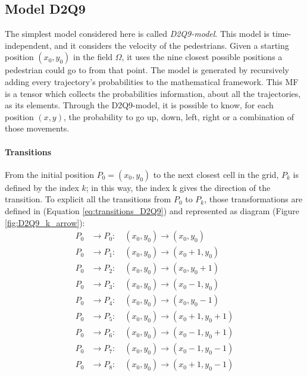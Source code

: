 \documentclass[class=article, crop=false]{standalone}
\begin{document}
\FloatBarrier
\newpage
\subsection{Model D2Q9} \label{chap:Model_D2Q9}

The simplest model considered here is called \emph{D2Q9-model}. 
This model is time-independent, and it considers the velocity of the pedestrians. 
Given a starting position $(x_0, y_0)$ in the field $\Omega$, it uses the nine closest possible positions a pedestrian could go to from that point. 
The model is generated by recursively adding every trajectory's probabilities to the mathematical framework.
This MF is a tensor which collects the probabilities information, about all the trajectories, as its elements.
Through the D2Q9-model, it is possible to know, for each position $(x, y)$, the probability to go up, down, left, right or a combination of those movements.


\paragraph{Transitions} 
From the initial position $P_0=(x_0, y_0)$ to the next closest cell in the grid, $P_k$ is defined by the index $k$; in this way, the index k gives the direction of the transition. 
To explicit all the transitions from $P_0$ to $P_k$, those transformations are defined in (Equation \ref{eq:transitions_D2Q9}) and represented as diagram (Figure \ref{fig:D2Q9_k_arrow}):
\begin{equation}
\begin{split}
P_0 &\to P_0 : \quad (x_0, y_0) \to (x_0, y_0) \\
P_0 &\to P_1 : \quad (x_0, y_0) \to (x_0+1, y_0) \\
P_0 &\to P_2 : \quad (x_0, y_0) \to (x_0, y_0+1) \\
P_0 &\to P_3 : \quad (x_0, y_0) \to (x_0-1, y_0) \\
P_0 &\to P_4 : \quad (x_0, y_0) \to (x_0, y_0-1) \\
P_0 &\to P_5 : \quad (x_0, y_0) \to (x_0+1, y_0+1) \\
P_0 &\to P_6 : \quad (x_0, y_0) \to (x_0-1, y_0+1) \\
P_0 &\to P_7 : \quad (x_0, y_0) \to (x_0-1, y_0-1) \\
P_0 &\to P_8 : \quad (x_0, y_0) \to (x_0+1, y_0-1) \\
\end{split}
\label{eq:transitions_D2Q9}
\end{equation}
\end{document}
